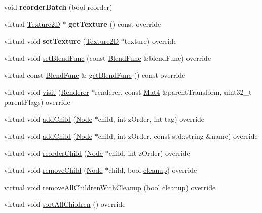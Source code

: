 \begin{DoxyCompactItemize}
void {\bfseries reorder\+Batch} (bool reorder)
\item 
\mbox{\label{classSpriteBatchNode_aa6c006fdfc877d41758b615cf464ca59}} 
virtual \hyperlink{classTexture2D}{Texture2D} $\ast$ {\bfseries get\+Texture} () const override
\item 
\mbox{\label{classSpriteBatchNode_a6986dd44726ca5b069a465814c4e3ad7}} 
virtual void {\bfseries set\+Texture} (\hyperlink{classTexture2D}{Texture2D} $\ast$texture) override
\item 
virtual void \hyperlink{classSpriteBatchNode_aea7694e73e37e957179a5d82565348e9}{set\+Blend\+Func} (const \hyperlink{structBlendFunc}{Blend\+Func} \&blend\+Func) override
\item 
virtual const \hyperlink{structBlendFunc}{Blend\+Func} \& \hyperlink{classSpriteBatchNode_a3ea94541fdb496876c1397aabf991474}{get\+Blend\+Func} () const override
\item 
virtual void \hyperlink{classSpriteBatchNode_afcdd1f0032ac902a52256fee7687cc36}{visit} (\hyperlink{classRenderer}{Renderer} $\ast$renderer, const \hyperlink{classMat4}{Mat4} \&parent\+Transform, uint32\+\_\+t parent\+Flags) override
\item 
virtual void \hyperlink{classSpriteBatchNode_a4d84535b9cdc98d8cfbb8d978f84fc93}{add\+Child} (\hyperlink{classNode}{Node} $\ast$child, int z\+Order, int tag) override
\item 
virtual void \hyperlink{classSpriteBatchNode_a50ba6ec6aead30d1abc28e75c75ca4fc}{add\+Child} (\hyperlink{classNode}{Node} $\ast$child, int z\+Order, const std\+::string \&name) override
\item 
virtual void \hyperlink{classSpriteBatchNode_a9f4e7d0be49a3c044424624ea283c301}{reorder\+Child} (\hyperlink{classNode}{Node} $\ast$child, int z\+Order) override
\item 
virtual void \hyperlink{classSpriteBatchNode_a7bebdfd28805ed83d0a78b49f8b52803}{remove\+Child} (\hyperlink{classNode}{Node} $\ast$child, bool \hyperlink{classNode_aa2de84c6cdeec9cd647d236c30ee0567}{cleanup}) override
\item 
virtual void \hyperlink{classSpriteBatchNode_a1b49c2764f43641c912c66c2d58b85a0}{remove\+All\+Children\+With\+Cleanup} (bool \hyperlink{classNode_aa2de84c6cdeec9cd647d236c30ee0567}{cleanup}) override
\item 
virtual void \hyperlink{classSpriteBatchNode_af2a850d2c664d2fd1a796601129a0413}{sort\+All\+Children} () override

\end{DoxyCompactItemize}

